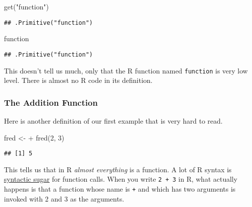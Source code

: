 \documentclass[
]{article}
\newenvironment{Shaded}{\begin{snugshade}}{\end{snugshade}}
\newcommand{\AttributeTok}[1]{\textcolor[rgb]{0.77,0.63,0.00}{#1}}
\newcommand{\DecValTok}[1]{\textcolor[rgb]{0.00,0.00,0.81}{#1}}
\newcommand{\FunctionTok}[1]{\textcolor[rgb]{0.00,0.00,0.00}{#1}}
\newcommand{\NormalTok}[1]{#1}
\newcommand{\OtherTok}[1]{\textcolor[rgb]{0.56,0.35,0.01}{#1}}
\newcommand{\StringTok}[1]{\textcolor[rgb]{0.31,0.60,0.02}{#1}}
\begin{document}
\begin{Shaded}
\begin{Highlighting}[]
\FunctionTok{get}\NormalTok{(}\StringTok{"function"}\NormalTok{)}
\end{Highlighting}
\end{Shaded}

\begin{verbatim}
## .Primitive("function")
\end{verbatim}

\begin{Shaded}
\begin{Highlighting}[]
\StringTok{\textasciigrave{}}\AttributeTok{function}\StringTok{\textasciigrave{}}
\end{Highlighting}
\end{Shaded}

\begin{verbatim}
## .Primitive("function")
\end{verbatim}

This doesn't tell us much, only that the R function named
\texttt{function} is very low level. There is almost no R code in its
definition.

\hypertarget{the-addition-function}{%
\subsubsection{The Addition Function}\label{the-addition-function}}

Here is another definition of our first example that is very hard to
read.

\begin{Shaded}
\begin{Highlighting}[]
\NormalTok{fred }\OtherTok{\textless{}{-}} \StringTok{\textasciigrave{}}\AttributeTok{+}\StringTok{\textasciigrave{}}
\FunctionTok{fred}\NormalTok{(}\DecValTok{2}\NormalTok{, }\DecValTok{3}\NormalTok{)}
\end{Highlighting}
\end{Shaded}

\begin{verbatim}
## [1] 5
\end{verbatim}

This tells us that in R \emph{almost everything} is a function. A lot of
R syntax is
\href{http://www.catb.org/jargon/html/S/syntactic-sugar.html}{syntactic sugar}
for function calls. When you write \texttt{2\ +\ 3} in R, what actually
happens is that a function whose name is \texttt{+} and which has two
arguments is invoked with 2 and 3 as the arguments.
\end{document}
